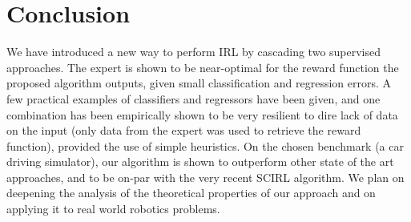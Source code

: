 \documentclass[smallextended]{svjour3}
\begin{document}
\section{Conclusion}
\label{sec:conclusion}
We have introduced a new way to perform IRL by cascading two supervised approaches. The expert is shown to be near-optimal for the reward function the proposed algorithm outputs, given small classification and regression errors. A few practical examples of classifiers and regressors have been given, and one combination has been empirically shown to be very resilient to dire lack of data on the input (only data from the expert was used to retrieve the reward function), provided the use of simple heuristics. On the chosen benchmark (a car driving simulator), our algorithm is shown to outperform other state of the art approaches, and to be on-par with the very recent SCIRL algorithm. We plan on deepening the analysis of the theoretical properties of our approach and on applying it to real world robotics problems.


\end{document}
